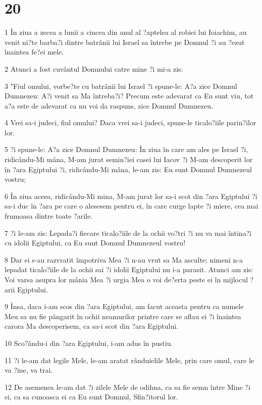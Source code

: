 \chapter{20}

\par 1 În ziua a zecea a lunii a cincea din anul al ?aptelea al robiei lui Ioiachim, au venit ni?te barba?i dintre batrânii lui Israel sa întrebe pe Domnul ?i au ?ezut înaintea fe?ei mele.
\par 2 Atunci a fost cuvântul Domnului catre mine ?i mi-a zis:
\par 3 "Fiul omului, vorbe?te cu batrânii lui Israel ?i spune-le: A?a zice Domnul Dumnezeu: A?i venit sa Ma întreba?i? Precum este adevarat ca Eu sunt viu, tot a?a este de adevarat ca nu voi da raspuns, zice Domnul Dumnezeu.
\par 4 Vrei sa-i judeci, fiul omului? Daca vrei sa-i judeci, spune-le ticalo?iile parin?ilor lor.
\par 5 ?i spune-le: A?a zice Domnul Dumnezeu: În ziua în care am ales pe Israel ?i, ridicându-Mi mâna, M-am jurat semin?iei casei lui Iacov ?i M-am descoperit lor în ?ara Egiptului ?i, ridicându-Mi mâna, le-am zis: Eu sunt Domnul Dumnezeul vostru;
\par 6 În ziua aceea, ridicându-Mi mina, M-am jurat lor sa-i scot din ?ara Egiptului ?i sa-i duc în ?ara pe care o alesesem pentru ei, în care curge lapte ?i miere, cea mai frumoasa dintre toate ?arile.
\par 7 ?i le-am zis: Lepada?i fiecare ticalo?iile de la ochii vo?tri ?i nu va mai întina?i cu idolii Egiptului, ca Eu sunt Domnul Dumnezeul vostru!
\par 8 Dar ei s-au razvratit împotriva Mea ?i n-au vrut sa Ma asculte; nimeni n-a lepadat ticalo?iile de la ochii sai ?i idolii Egiptului nu i-a parasit. Atunci am zis: Voi varsa asupra lor mânia Mea ?i urgia Mea o voi de?erta peste ei în mijlocul ?arii Egiptului.
\par 9 Însa, daca i-am scos din ?ara Egiptului, am facut aceasta pentru ca numele Meu sa nu fie pângarit în ochii neamurilor printre care se aflau ei ?i înaintea carora Ma descoperisem, ca sa-i scot din ?ara Egiptului.
\par 10 Sco?ându-i din ?ara Egiptului, i-am adus în pustiu.
\par 11 ?i le-am dat legile Mele, le-am aratat rânduielile Mele, prin care omul, care le va ?ine, va trai.
\par 12 De asemenea le-am dat ?i zilele Mele de odihna, ca sa fie semn între Mine ?i ei, ca sa cunoasca ei ca Eu sunt Domnul, Sfin?itorul lor.
